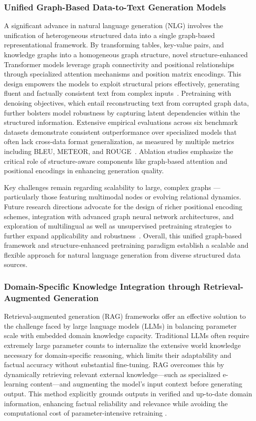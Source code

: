 \documentclass[sigconf]{acmart}
\begin{document}
\subsubsection{Unified Graph-Based Data-to-Text Generation Models}

A significant advance in natural language generation (NLG) involves the unification of heterogeneous structured data into a single graph-based representational framework. By transforming tables, key-value pairs, and knowledge graphs into a homogeneous graph structure, novel structure-enhanced Transformer models leverage graph connectivity and positional relationships through specialized attention mechanisms and position matrix encodings. This design empowers the models to exploit structural priors effectively, generating fluent and factually consistent text from complex inputs~\cite{ref46}. Pretraining with denoising objectives, which entail reconstructing text from corrupted graph data, further bolsters model robustness by capturing latent dependencies within the structured information. Extensive empirical evaluations across six benchmark datasets demonstrate consistent outperformance over specialized models that often lack cross-data format generalization, as measured by multiple metrics including BLEU, METEOR, and ROUGE~\cite{ref46}. Ablation studies emphasize the critical role of structure-aware components like graph-based attention and positional encodings in enhancing generation quality.

Key challenges remain regarding scalability to large, complex graphs — particularly those featuring multimodal nodes or evolving relational dynamics. Future research directions advocate for the design of richer positional encoding schemes, integration with advanced graph neural network architectures, and exploration of multilingual as well as unsupervised pretraining strategies to further expand applicability and robustness~\cite{ref46}. Overall, this unified graph-based framework and structure-enhanced pretraining paradigm establish a scalable and flexible approach for natural language generation from diverse structured data sources.

\subsubsection{Domain-Specific Knowledge Integration through Retrieval-Augmented Generation}

Retrieval-augmented generation (RAG) frameworks offer an effective solution to the challenge faced by large language models (LLMs) in balancing parameter scale with embedded domain knowledge capacity. Traditional LLMs often require extremely large parameter counts to internalize the extensive world knowledge necessary for domain-specific reasoning, which limits their adaptability and factual accuracy without substantial fine-tuning. RAG overcomes this by dynamically retrieving relevant external knowledge—such as specialized e-learning content—and augmenting the model’s input context before generating output. This method explicitly grounds outputs in verified and up-to-date domain information, enhancing factual reliability and relevance while avoiding the computational cost of parameter-intensive retraining \cite{ref8}. 
\end{document}
